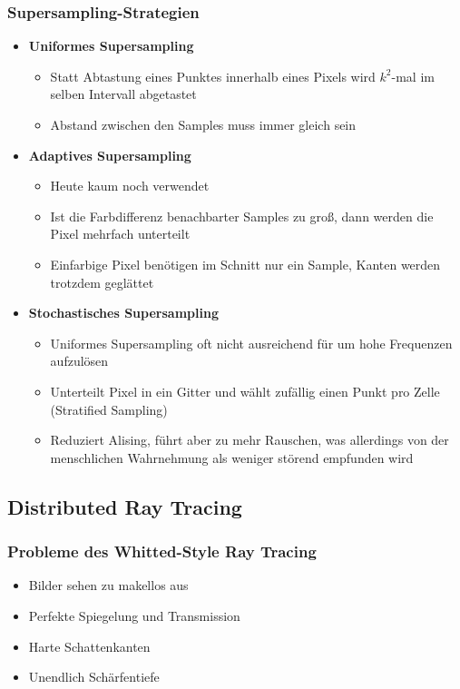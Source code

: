 \subsubsection{Supersampling-Strategien}
\begin{itemize}
	\item \textbf{Uniformes Supersampling}
	\begin{itemize}
		\item Statt Abtastung eines Punktes innerhalb eines Pixels wird \(k^2\)-mal im selben Intervall abgetastet
		\item Abstand zwischen den Samples muss immer gleich sein
	\end{itemize}
	\item \textbf{Adaptives Supersampling}
	\begin{itemize}
		\item Heute kaum noch verwendet
		\item Ist die Farbdifferenz benachbarter Samples zu groß, dann werden die Pixel mehrfach unterteilt
		\item Einfarbige Pixel benötigen im Schnitt nur ein Sample, Kanten werden trotzdem geglättet
	\end{itemize}
	\item \textbf{Stochastisches Supersampling}
	\begin{itemize}
		\item Uniformes Supersampling oft nicht ausreichend für um hohe Frequenzen aufzulösen
		\item Unterteilt Pixel in ein Gitter und wählt zufällig einen Punkt pro Zelle (Stratified Sampling)
		\item Reduziert Alising, führt aber zu mehr Rauschen, was allerdings von der menschlichen Wahrnehmung als weniger störend empfunden wird
	\end{itemize}
\end{itemize}


\subsection{Distributed Ray Tracing}

\subsubsection{Probleme des Whitted-Style Ray Tracing}
\begin{itemize}
	\item Bilder sehen zu makellos aus
	\item Perfekte Spiegelung und Transmission
	\item Harte Schattenkanten
	\item Unendlich Schärfentiefe
\end{itemize}

